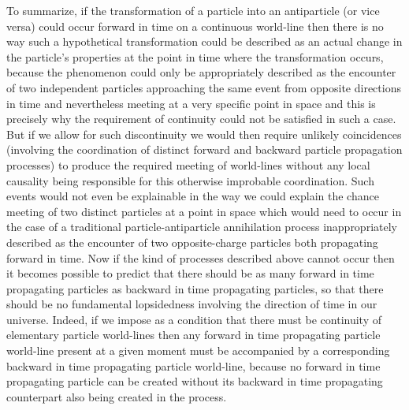 \documentclass[notitlepage,12pt]{report}
\begin{document}
To summarize, if the transformation of a particle into an antiparticle (or vice versa) could occur forward in time on a continuous world-line then there is no way such a hypothetical transformation could be described as an actual change in the particle's properties at the point in time where the transformation occurs, because the phenomenon could only be appropriately described as the encounter of two independent particles approaching the same event from opposite directions in time and nevertheless meeting at a very specific point in space and this is precisely why the requirement of continuity could not be satisfied in such a case. But if we allow for such discontinuity we would then require unlikely coincidences (involving the coordination of distinct forward and backward particle propagation processes) to produce the required meeting of world-lines without any local causality being responsible for this otherwise improbable coordination. Such events would not even be explainable in the way we could explain the chance meeting of two distinct particles at a point in space which would need to occur in the case of a traditional particle-antiparticle annihilation process inappropriately described as the encounter of two opposite-charge particles both propagating forward in time. Now if the kind of processes described above cannot occur then it becomes possible to predict that there should be as many forward in time propagating particles as backward in time propagating particles, so that there should be no fundamental lopsidedness involving the direction of time in our universe. Indeed, if we impose as a condition that there must be continuity of elementary particle world-lines then any forward in time propagating particle world-line present at a given moment must be accompanied by a corresponding backward in time propagating particle world-line, because no forward in time propagating particle can be created without its backward in time propagating counterpart also being created in the process.
\end{document}
